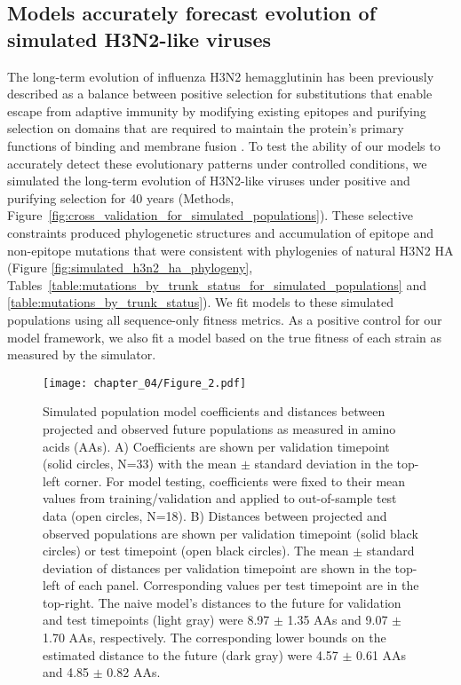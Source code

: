 \subsection*{Models accurately forecast evolution of simulated H3N2-like viruses}

The long-term evolution of influenza H3N2 hemagglutinin has been previously described as a balance between positive selection for substitutions that enable escape from adaptive immunity by modifying existing epitopes and purifying selection on domains that are required to maintain the protein's primary functions of binding and membrane fusion \citep{Bush:1999vj,Neher2013,Luksza:2014hj,Koelle:2015dh}.
To test the ability of our models to accurately detect these evolutionary patterns under controlled conditions, we simulated the long-term evolution of H3N2-like viruses under positive and purifying selection for 40 years (Methods, Figure~\ref{fig:cross_validation_for_simulated_populations}).
These selective constraints produced phylogenetic structures and accumulation of epitope and non-epitope mutations that were consistent with phylogenies of natural H3N2 HA (Figure \ref{fig:simulated_h3n2_ha_phylogeny}, Tables~\ref{table:mutations_by_trunk_status_for_simulated_populations} and \ref{table:mutations_by_trunk_status}).
We fit models to these simulated populations using all sequence-only fitness metrics.
As a positive control for our model framework, we also fit a model based on the true fitness of each strain as measured by the simulator.

\begin{figure}
  \begin{center}
  \texttt{[image: chapter\_04/Figure\_2.pdf]}
  \caption{
    Simulated population model coefficients and distances between projected and observed future populations as measured in amino acids (AAs).
    A) Coefficients are shown per validation timepoint (solid circles, N=33) with the mean $\pm$ standard deviation in the top-left corner.
    For model testing, coefficients were fixed to their mean values from training/validation and applied to out-of-sample test data (open circles, N=18).
    B) Distances between projected and observed populations are shown per validation timepoint (solid black circles) or test timepoint (open black circles).
    The mean $\pm$ standard deviation of distances per validation timepoint are shown in the top-left of each panel.
    Corresponding values per test timepoint are in the top-right.
    The naive model's distances to the future for validation and test timepoints (light gray) were 8.97 $\pm$ 1.35 AAs and 9.07 $\pm$ 1.70 AAs, respectively.
    The corresponding lower bounds on the estimated distance to the future (dark gray) were 4.57 $\pm$ 0.61 AAs and 4.85 $\pm$ 0.82 AAs.
  }
  \label{fig:unadjusted_model_accuracy_and_coefficients_for_simulated_populations_controls}
  \end{center}
\end{figure}

